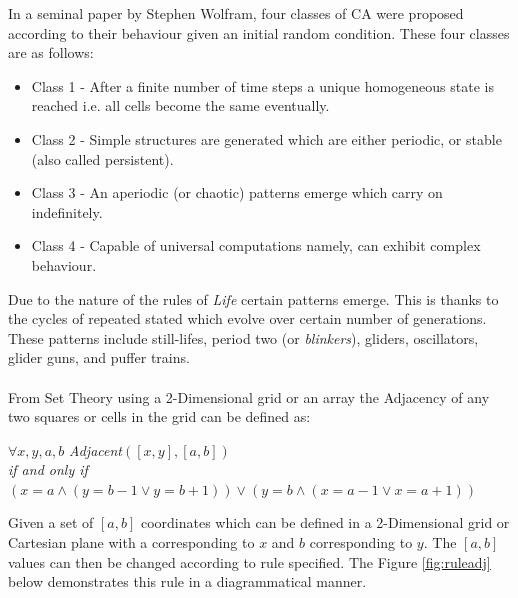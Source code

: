 In a seminal paper by Stephen Wolfram, four classes of CA were proposed according to their behaviour given an initial random condition\citep{Wolfram1984}. These four classes are as follows:
\begin{itemize}
\item Class 1 - After a finite number of time steps a unique homogeneous state is reached i.e. all cells become the same eventually.
\item Class 2 - Simple structures are generated which are either periodic, or stable (also called persistent).
\item Class 3 - An aperiodic (or chaotic) patterns emerge which carry on indefinitely.
\item Class 4 - Capable of universal computations namely, can exhibit complex behaviour. 
\end{itemize}
Due to the nature of the rules of \textsl{Life} certain patterns emerge. This is thanks to the cycles of repeated stated which evolve over certain number of generations. These patterns include still-lifes, period two (or \textsl{blinkers}), gliders, oscillators, glider guns, and puffer trains\citep{adamatzky2010game}.
\\\\
From Set Theory using a 2-Dimensional grid or an array the Adjacency of any two squares or cells in the grid can be defined as:\cite{aima}
\begin{center}
$\forall x, y, a, b$ \textit{Adjacent}$([x, y], [a, b])$\\\textit{if and only if}\\$(x = a \land (y = b - 1 \lor y = b + 1)) \lor (y = b \land (x = a - 1 \lor x = a + 1))$
\end{center}
Given a set of $[a, b]$ coordinates which can be defined in a 2-Dimensional grid or Cartesian plane with a corresponding to $x$ and $b$ corresponding to $y$. The $[a, b]$ values can then be changed according to rule specified. The Figure \ref{fig:ruleadj} below demonstrates this rule in a diagrammatical manner.
